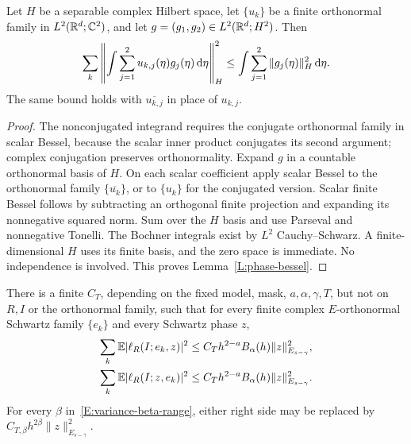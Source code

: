 \begin{lemma}\label{L:phase-bessel}
  Let $H$ be a separable complex Hilbert space, let $\{u_k\}$ be a finite
  orthonormal family in $L^2(\mathbb{R}^d;\mathbb{C}^2)$, and let $g = (g_1,g_2) \in
  L^2(\mathbb{R}^d;H^2)$. Then
  \begin{equation}\label{E:phase-bessel}
    \sum_k\left\|\int\sum_{j=1}^2u_{k,j}(\eta)g_j(\eta)\,\mathrm{d}\eta\right\|_H^2
    \le \int\sum_{j=1}^2\|g_j(\eta)\|_H^2\,\mathrm{d}\eta.
  \end{equation}
  The same bound holds with $\overline{u_{k,j}}$ in place of $u_{k,j}$.
\end{lemma}

\begin{proof}
  The nonconjugated integrand requires the conjugate orthonormal family in
  scalar Bessel, because the scalar inner product conjugates its second
  argument; complex conjugation preserves orthonormality.
  Expand $g$ in a countable orthonormal basis of $H$. On each scalar coefficient
  apply scalar Bessel to the orthonormal family $\{\overline{u_k}\}$, or to
  $\{u_k\}$ for the conjugated version. Scalar finite Bessel follows by
  subtracting an orthogonal finite projection and expanding its nonnegative
  squared norm. Sum over the $H$ basis and use Parseval and nonnegative Tonelli.
  The Bochner integrals exist by $L^2$ Cauchy--Schwarz. A finite-dimensional $H$
  uses its finite basis, and the zero space is immediate. No independence is
  involved. This proves Lemma~\ref{L:phase-bessel}.
\end{proof}

\begin{proposition}\label{P:wave-two-variances}
  There is a finite $C_T$, depending on the fixed model, mask,
  $a,\alpha,\gamma,T$, but not on $R,I$ or the orthonormal family, such that for
  every finite complex $E$-orthonormal Schwartz family $\{e_k\}$ and every
  Schwartz phase $z$,
  \begin{align}
    \sum_k\mathbb{E}|\ell_R(I;e_k,z)|^2
    &\le C_T h^{2-a}B_\alpha(h)\|z\|_{E_{s-\gamma}}^2,
    \label{E:wave-input-variance}\\
    \sum_k\mathbb{E}|\ell_R(I;z,e_k)|^2
    &\le C_T h^{2-a}B_\alpha(h)\|z\|_{E_{s-\gamma}}^2.
    \label{E:wave-output-variance}
  \end{align}
  For every $\beta$ in~\eqref{E:variance-beta-range}, either right side may be
  replaced by $C_{T,\beta}h^{2\beta}\|z\|_{E_{s-\gamma}}^2$.
\end{proposition}

